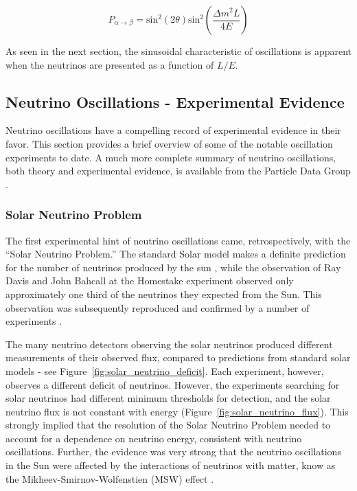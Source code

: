 \begin{equation}
P_{\alpha\rightarrow\beta} = \text{sin}^2(2\theta)\text{sin}^2\left( \frac{\Delta m^2 L}{4 E} \right)
\end{equation}

As seen in the next section, the sinusoidal characteristic of oscillations is apparent when the neutrinos are presented as a function of $L/E$.

\subsection{Neutrino Oscillations - Experimental Evidence}

Neutrino oscillations have a compelling record of experimental evidence in their favor.  This section provides a brief overview of some of the notable oscillation experiments to date.  A much more complete summary of neutrino oscillations, both theory and experimental evidence, is available from the Particle Data Group \cite{Agashe:2014kda}.

\subsubsection{Solar Neutrino Problem}

The first experimental hint of neutrino oscillations came, retrospectively, with the ``Solar Neutrino Problem.''  The standard Solar model makes a definite prediction for the number of neutrinos produced by the sun \cite{Bahcall:2004pz}, while the observation of Ray Davis and John Bahcall at the Homestake experiment observed only approximately one third of the neutrinos they expected from the Sun.  This observation was subsequently reproduced and confirmed by a number of experiments \cite{Hampel:1998xg, Fukuda:1996sz, Gavrin:2005ks, Anselmann:1992um, Altmann:2005ix, Fukuda:2002pe, Ahmad:2001an, Ahmad:2002jz}.

The many neutrino detectors observing the solar neutrinos produced different measurements of their observed flux, compared to predictions from standard solar models - see Figure~\ref{fig:solar_neutrino_deficit}.  Each experiment, however, observes a different deficit of neutrinos.  However, the experiments searching for solar neutrinos had different minimum thresholds for detection, and the solar neutrino flux is not constant with energy (Figure~\ref{fig:solar_neutrino_flux}).  This strongly implied that the resolution of the Solar Neutrino Problem needed to account for a dependence on neutrino energy, consistent with neutrino oscillations.  Further, the evidence was very strong that the neutrino oscillations in the Sun were affected by the interactions of neutrinos with matter, know as the Mikheev-Smirnov-Wolfenstien (MSW) effect \cite{Wolfenstein:1977ue,Mikheev:1986gs}.

